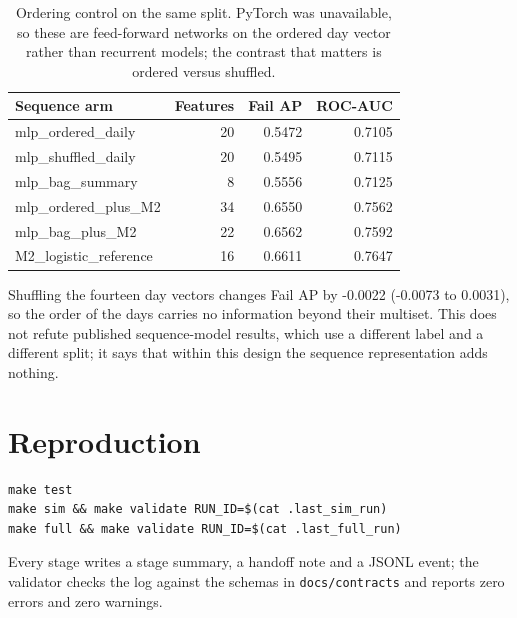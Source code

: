 \documentclass[11pt]{article}
\begin{document}
\begin{table}[t]
\centering
\footnotesize
\begin{tabular}{lrrr}
\toprule
Sequence arm & Features & Fail AP & ROC-AUC \\
\midrule
mlp\_ordered\_daily & 20 & 0.5472 & 0.7105 \\
mlp\_shuffled\_daily & 20 & 0.5495 & 0.7115 \\
mlp\_bag\_summary & 8 & 0.5556 & 0.7125 \\
mlp\_ordered\_plus\_M2 & 34 & 0.6550 & 0.7562 \\
mlp\_bag\_plus\_M2 & 22 & 0.6562 & 0.7592 \\
M2\_logistic\_reference & 16 & 0.6611 & 0.7647 \\
\bottomrule
\end{tabular}
\caption{Ordering control on the same split. PyTorch was unavailable, so these are feed-forward networks on the ordered day vector rather than recurrent models; the contrast that matters is ordered versus shuffled.}
\label{tab:v5}
\end{table}
Shuffling the fourteen day vectors changes Fail AP by -0.0022 (-0.0073 to 0.0031), so the order of the days carries no information beyond their multiset. This does not refute published sequence-model results, which use a different label and a different split; it says that within this design the sequence representation adds nothing.
\section{Reproduction}
\begin{verbatim}
make test
make sim && make validate RUN_ID=$(cat .last_sim_run)
make full && make validate RUN_ID=$(cat .last_full_run)
\end{verbatim}
Every stage writes a stage summary, a handoff note and a JSONL event; the validator
checks the log against the schemas in \texttt{docs/contracts} and reports zero errors
and zero warnings.
\end{document}
